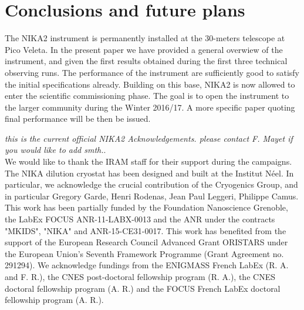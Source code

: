 \documentclass[]{aa} %
\begin{document}


\section{Conclusions and future plans}

The NIKA2 instrument is permanently installed at the 30-meters telescope at Pico Veleta. In the present paper we have provided a general overwiew of the instrument, and given the first results obtained during the first three technical observing runs. The performance of the instrument are sufficiently good to satisfy the initial specifications already. Building on this base, NIKA2 is now allowed to enter the scientific commissioning phase. The goal is to open the instrument to the larger community during the Winter 2016/17. A more specific paper quoting final performance will be then be issued. 


\begin{acknowledgements}
{\it this is the current official NIKA2 Acknowledgements. please contact F.
Mayet if you would like to add smth.}.\\
We would like to thank the IRAM staff for their support during the campaigns. 
The NIKA dilution cryostat has been designed and built at the Institut N\'eel. 
In particular, we acknowledge the crucial contribution of the Cryogenics Group, and 
in particular Gregory Garde, Henri Rodenas, Jean Paul Leggeri, Philippe Camus. 
This work has been partially funded by the Foundation Nanoscience Grenoble, the LabEx FOCUS ANR-11-LABX-0013 and 
the ANR under the contracts "MKIDS", "NIKA" and ANR-15-CE31-0017. 
This work has benefited from the support of the European Research Council Advanced Grant ORISTARS 
under the European Union's Seventh Framework Programme (Grant Agreement no. 291294).
We acknowledge fundings from the ENIGMASS French LabEx (R. A. and F. R.), 
the CNES post-doctoral fellowship program (R. A.),  the CNES doctoral fellowship program (A. R.) and 
the FOCUS French LabEx doctoral fellowship program (A. R.).


\end{acknowledgements}
\end{document}
